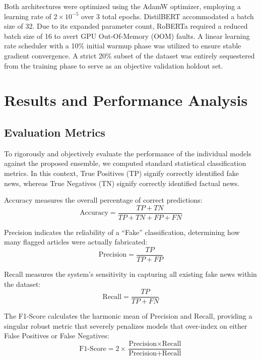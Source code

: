 \documentclass[conference]{IEEEtran}
\begin{document}
Both architectures were optimized using the AdamW optimizer, employing a learning rate of $2 \times 10^{-5}$ over 3 total epochs. DistilBERT accommodated a batch size of 32. Due to its expanded parameter count, RoBERTa required a reduced batch size of 16 to avert GPU Out-Of-Memory (OOM) faults. A linear learning rate scheduler with a 10\% initial warmup phase was utilized to ensure stable gradient convergence. A strict 20\% subset of the dataset was entirely sequestered from the training phase to serve as an objective validation holdout set.

\section{Results and Performance Analysis}

\subsection{Evaluation Metrics}
To rigorously and objectively evaluate the performance of the individual models against the proposed ensemble, we computed standard statistical classification metrics. In this context, True Positives (TP) signify correctly identified fake news, whereas True Negatives (TN) signify correctly identified factual news.

Accuracy measures the overall percentage of correct predictions:
\begin{equation}
\text{Accuracy} = \frac{TP + TN}{TP + TN + FP + FN}
\end{equation}

Precision indicates the reliability of a ``Fake'' classification, determining how many flagged articles were actually fabricated:
\begin{equation}
\text{Precision} = \frac{TP}{TP + FP}
\end{equation}

Recall measures the system's sensitivity in capturing all existing fake news within the dataset:
\begin{equation}
\text{Recall} = \frac{TP}{TP + FN}
\end{equation}

The F1-Score calculates the harmonic mean of Precision and Recall, providing a singular robust metric that severely penalizes models that over-index on either False Positives or False Negatives:
\begin{equation}
\text{F1-Score} = 2 \times \frac{\text{Precision} \times \text{Recall}}{\text{Precision} + \text{Recall}}
\end{equation}
\end{document}
